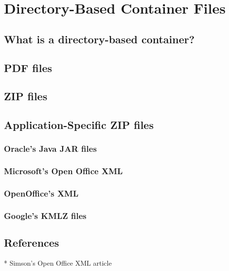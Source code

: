 \chapter{Directory-Based Container Files}
\section{What is a directory-based container?}
\section{PDF files}
\section{ZIP files}
\section{Application-Specific ZIP files}
\subsection{Oracle's Java JAR files}
\subsection{Microsoft's Open Office XML}
\subsection{OpenOffice's XML}
\subsection{Google's KMLZ files}
\section{References}
* Simson's Open Office XML article

